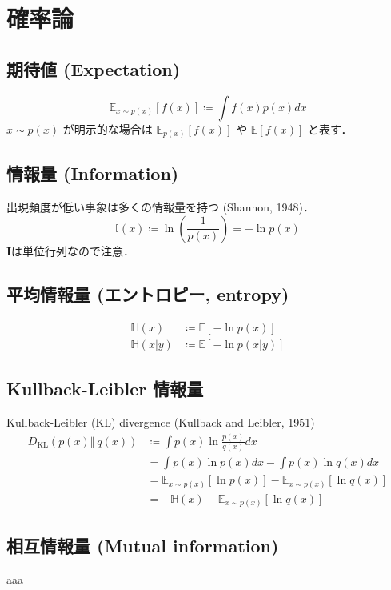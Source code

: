 \section{確率論}
\subsection{期待値 (Expectation)}
\begin{equation}
\mathbb{E}_{x\sim p(x)}\left[f(x)\right]\coloneqq\int f(x)p(x)dx
\end{equation}
$x\sim p(x)$ が明示的な場合は $\mathbb{E}_{p(x)}\left[f(x)\right]$ や $\mathbb{E}\left[f(x)\right]$ と表す．
\subsection{情報量 (Information)}
出現頻度が低い事象は多くの情報量を持つ (Shannon, 1948)．
\begin{equation}
\mathbb{I}(x)\coloneqq\ln\left(\frac{1}{p(x)}\right)=-\ln p(x)
\end{equation}
$\mathbf{I}$は単位行列なので注意．
\subsection{平均情報量 (エントロピー, entropy)}
\begin{align}
\mathbb{H}(x)&\coloneqq\mathbb{E}[-\ln p(x)]\\
\mathbb{H}(x\vert y)&\coloneqq\mathbb{E}[-\ln p(x\vert y)]
\end{align}
\subsection{Kullback-Leibler 情報量}
Kullback-Leibler (KL) divergence (Kullback and Leibler, 1951)
\begin{align}
D_{\text{KL}}\left(p(x) \Vert\ q(x)\right)&\coloneqq\int p(x) \ln \frac{p(x)}{q(x)} dx\\
&=\int p(x) \ln p(x) dx-\int p(x) \ln q(x) dx\\
&=\mathbb{E}_{x\sim p(x)}[\ln p(x)]-\mathbb{E}_{x\sim p(x)}[\ln q(x)]\\
&=-\mathbb{H}(x)-\mathbb{E}_{x\sim p(x)}[\ln q(x)]
\end{align}
\subsection{相互情報量 (Mutual information)}
aaa
